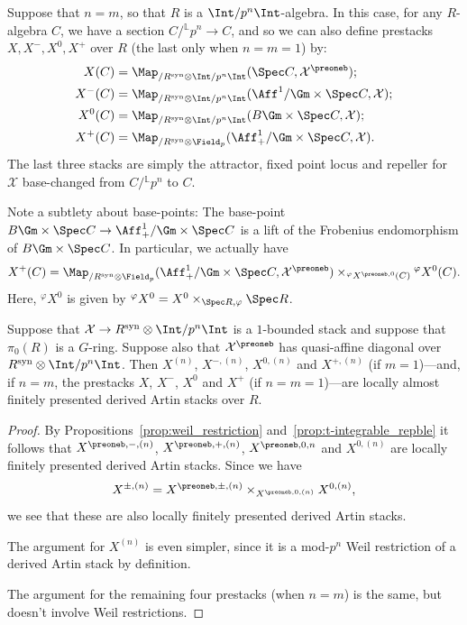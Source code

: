 \documentclass[10pt]{amsart}
\begin{document}
\subsubsection{}
Suppose that $n=m$, so that $R$ is a $\Int/p^n\Int$-algebra. In this case, for any $R$-algebra $C$, we have a section $C/{}^{\mathbb{L}}p^n\to C$, and so we can also define prestacks $X,X^-,X^0,X^+$ over $R$ (the last only when $n=m=1$) by:
\begin{align*}
X(C) &=\Map_{/R^{\mathrm{syn}}\otimes\Int/p^n\Int}(\Spec C,\mathcal{X}^\preoneb);\\
X^{-}(C) &=\Map_{/R^{\mathrm{syn}}\otimes\Int/p^n\Int}(\Aff^1/\Gm\times\Spec C,\mathcal{X});\\
X^{0}(C) &=\Map_{/R^{\mathrm{syn}}\otimes\Int/p^n\Int}(B\Gm\times\Spec C,\mathcal{X});\\
X^{+}(C) &=\Map_{/R^{\mathrm{syn}}\otimes\Field_p}(\Aff^1_+/\Gm\times\Spec C,\mathcal{X}).
\end{align*}
The last three stacks are simply the attractor, fixed point locus and repeller for $\mathcal{X}$ base-changed from $C/{}^{\mathbb{L}}p^n$ to $C$. 

Note a subtlety about base-points: The base-point $B\Gm\times\Spec C\to \Aff^1_+/\Gm\times\Spec C$ is a lift of the Frobenius endomorphism of $B\Gm\times \Spec C$. In particular, we actually have
\[
X^+(C) = \Map_{/R^{\mathrm{syn}}\otimes\Field_p}(\Aff^1_+/\Gm\times\Spec C,\mathcal{X}^\preoneb)\times_{{}^\varphi X^{\preoneb,0}(C)}{}^\varphi X^0(C).
\]
Here, ${}^\varphi X^0$ is given by ${}^{\varphi}X^0 = X^0\times_{\Spec R,\varphi}\Spec R$.

\begin{proposition}
\label{prop:X_attractor_repble}
Suppose that $\mathcal{X}\to R^{\mathrm{syn}}\otimes\Int/p^n\Int$ is a $1$-bounded stack and suppose that $\pi_0(R)$ is a $G$-ring. Suppose also that $\mathcal{X}^\preoneb$ has quasi-affine diagonal over $ R^{\mathrm{syn}}\otimes\Int/p^n\Int$. Then $X^{(n)}$, $X^{-,(n)}$, $X^{0,(n)}$ and $X^{+,(n)}$ (if $m=1$)---and, if $n=m$, the prestacks $X$, $X^-$, $X^0$ and $X^+$ (if $n=m=1$)---are locally almost finitely presented derived Artin stacks over $R$.
\end{proposition} 
\begin{proof}
By Propositions~\ref{prop:weil_restriction} and~\ref{prop:t-integrable_repble} it follows that $X^{\preoneb,-,(n)}$, $X^{\preoneb,+,(n)}$, $X^{\preoneb,0,n}$ and $X^{0,(n)}$ are locally finitely presented derived Artin stacks. Since we have
\[
X^{\pm,(n)} = X^{\preoneb,\pm,(n)}\times_{X^{\preoneb,0,(n)}}X^{0,(n)},
\]
we see that these are also locally finitely presented derived Artin stacks.

The argument for $X^{(n)}$ is even simpler, since it is a mod-$p^n$ Weil restriction of a derived Artin stack by definition.

The argument for the remaining four prestacks (when $n=m$) is the same, but doesn't involve Weil restrictions.
\end{proof}
\end{document}
